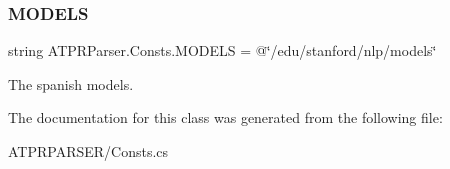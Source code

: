 \subsubsection{\texorpdfstring{M\+O\+D\+E\+LS}{MODELS}}
{\footnotesize\ttfamily string A\+T\+P\+R\+Parser.\+Consts.\+M\+O\+D\+E\+LS = @\char`\"{}/edu/stanford/nlp/models\char`\"{}\hspace{0.3cm}{\ttfamily [static]}}



The spanish models. 



The documentation for this class was generated from the following file\+:\begin{DoxyCompactItemize}
\item 
A\+T\+P\+R\+P\+A\+R\+S\+E\+R/Consts.\+cs\end{DoxyCompactItemize}
